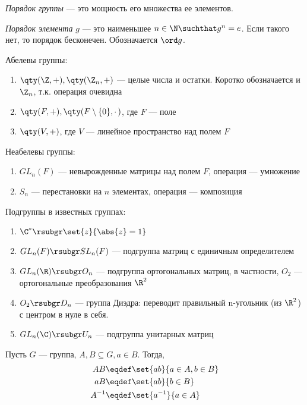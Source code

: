 \begin{definition}
  \emph{Порядок группы} --- это мощность его множества ее элементов.
\end{definition}

\begin{definition}
  \emph{Порядок элемента} $g$ --- это наименьшее $n \in \N \suchthat g^n=e$. Если такого нет, то порядок бесконечен. Обозначается $\ord g$.
\end{definition}

\begin{examples}
  Абелевы группы:
  \begin{enumerate}
    \item $\qty(\Z, +), \qty(\Z_n, +)$ --- целые числа и остатки. Коротко обозначается \Z и $\Z_n$, т.\:к. операция очевидна
    \item $\qty(F, +), \qty(F\setminus\{0\}, \cdotp)$, где $F$ --- поле
    \item $\qty(V, +)$, где $V$ --- линейное пространство над полем $F$
  \end{enumerate}

  Неабелевы группы:
  \begin{enumerate}[resume]
    \item $GL_n(F)$ --- невырожденные матрицы над полем $F$, операция --- умножение
    \item $S_n$ --- перестановки на $n$ элементах, операция --- композиция
  \end{enumerate}

  Подгруппы в известных группах:
  \begin{enumerate}[resume]
    \item $\C^\ast \rsubgr \set{z}{\abs{z}=1}$
    \item $GL_n(F) \rsubgr SL_n(F)$ --- подгруппа матриц с единичным определителем
    \item $GL_n(\R) \rsubgr O_n$ --- подгруппа ортогональных матриц, в частности, $O_2$ --- ортогональные преобразования $\R^2$
    \item $O_2 \rsubgr D_n$ --- группа Диэдра: переводит правильный n-угольник (из $\R^2$) с центром в нуле в себя.
    \item $GL_n(\C) \rsubgr U_n$ --- подгруппа унитарных матриц
  \end{enumerate}
\end{examples}


\begin{definition}
  Пусть $G$ --- группа, $A,B\subseteq G, a\in B$. Тогда,
  \begin{align*}
    AB     & \eqdef \set{ab}{a\in A, b \in B} \\
    aB     & \eqdef \set{ab}{b \in B}         \\
    A^{-1} & \eqdef \set{a^{-1}}{a \in A}
  \end{align*}
\end{definition}

